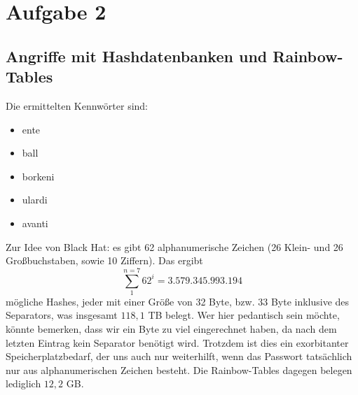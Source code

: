 \documentclass[12pt,a4paper]{article}
\begin{document}
\section*{Aufgabe 2}
\subsection{Angriffe mit Hashdatenbanken und Rainbow-Tables}
Die ermittelten Kennwörter sind:
\begin{itemize}
\item ente
\item ball
\item borkeni
\item ulardi
\item avanti
\end{itemize}
Zur Idee von Black Hat:
es gibt 62 alphanumerische Zeichen (26 Klein- und 26 Großbuchstaben, sowie 10 Ziffern).
Das ergibt $$ \sum_1^{n=7} 62^i = 3.579.345.993.194 $$ mögliche Hashes, jeder mit einer Größe von 32 Byte, bzw. 33 Byte inklusive des Separators, was insgesamt $118,1$ TB belegt. Wer hier pedantisch sein möchte, könnte bemerken, dass wir ein Byte zu viel eingerechnet haben, da nach dem letzten Eintrag kein Separator benötigt wird. Trotzdem ist dies ein exorbitanter Speicherplatzbedarf, der uns auch nur weiterhilft, wenn das Passwort tatsächlich nur aus alphanumerischen Zeichen besteht. Die Rainbow-Tables dagegen belegen lediglich $12,2$ GB.
\end{document}

